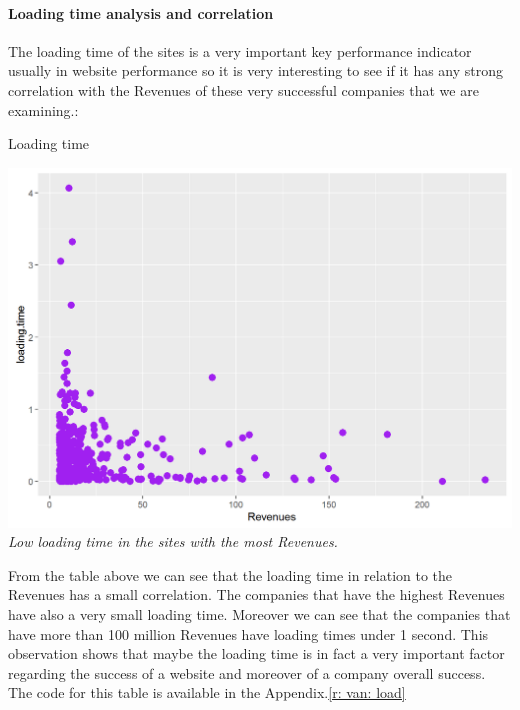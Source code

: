 \documentclass{article}
\begin{document}
\paragraph{Loading time analysis and correlation}
The loading time of the sites is a very important key performance indicator usually in website performance so it is very interesting to see if it has any strong correlation with the Revenues of these very successful companies that we are examining.:
\begin{table}[H]
\centering
\caption{Loading time}
\begin{center}
\includegraphics[scale=0.4]{../R/photos/31_ld_rev.png}  \\
\textit{Low loading time in the sites with the most Revenues.}
\end{center}
\end{table}
From the table above we can see that the loading time in relation to the Revenues has a small correlation. The companies that have the highest Revenues have also a very small loading time. Moreover we can see that the companies that have more than 100 million Revenues have loading times under 1 second. This observation shows that maybe the loading time is in fact a very important factor regarding the success of a website and moreover of a company overall success. The code for this table is available in the Appendix.\ref{r: van: load}
\end{document}
